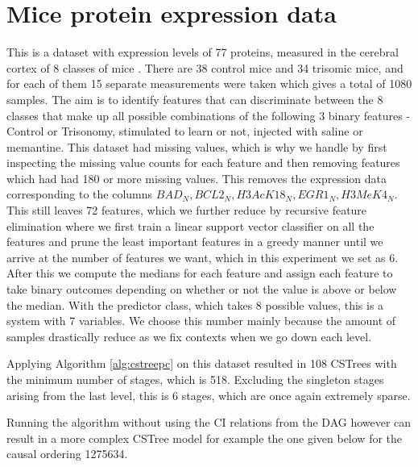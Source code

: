 \documentclass{tufte-book}
\begin{document}
 \newpage 

\section{Mice protein expression data}
\label{sec:orgda1c134}
This is a dataset with expression levels of 77 proteins, measured in the cerebral cortex of 8 classes of mice \cite{higuera-2015-self-organ}. There are 38 control mice and 34 trisomic mice, and for each of them 15 separate measurements were taken which gives a total of 1080 samples. The aim is to identify features that can discriminate between the 8 classes that make up all possible combinations of the following 3 binary features - Control or Trisonomy, stimulated to learn or not, injected with saline or memantine. This dataset had missing values, which is why we handle by first inspecting the missing value counts for each feature and then removing features which had had 180 or more missing values. This removes the expression data corresponding to the columns \(BAD_N, BCL2_N, H3AcK18_N, EGR1_N, H3MeK4_N\). This still leaves 72 features, which we further reduce by recursive feature elimination \cite{guyon-2002} where we first train a linear support vector classifier on all the features and prune the least important features in a greedy manner until we arrive at the number of features we want, which in this experiment we set as 6. After this we compute the medians for each feature and assign each feature to take binary outcomes depending on whether or not the value is above or below the median. With the predictor class, which takes 8 possible values, this is a system with 7 variables. We choose this number mainly because the amount of samples drastically reduce as we fix contexts when we go down each level.


Applying Algorithm \ref{alg:cstreepc} on this dataset resulted in 108 CSTrees with the minimum number of stages, which is 518. Excluding the singleton stages arising from the last level, this is 6 stages, which are once again extremely sparse.


Running the algorithm without using the CI relations from the DAG however can result in a more complex CSTree model for example the one given below for the causal ordering 1275634.
\end{document}
